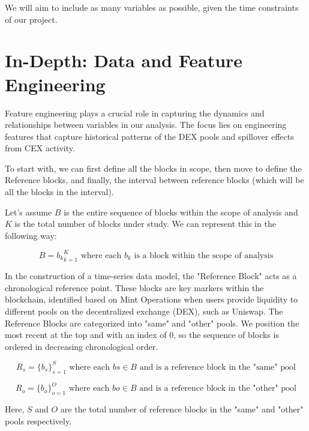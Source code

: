 \documentclass{article}
\begin{document}
{We will aim to include as many variables as possible, given the time constraints of our project.




\section*{\textbf{In-Depth: Data and Feature Engineering}}

Feature engineering plays a crucial role in capturing the dynamics and relationships between variables in our analysis. The focus lies on engineering features that capture historical patterns of the DEX pools and spillover effects from CEX activity.

To start with, we can first define all the blocks in scope, then move to define the Reference blocks, and finally, the interval between reference blocks (which will be all the blocks in the interval).

Let's assume $B$ is the entire sequence of blocks within the scope of analysis and $K$ is the total number of blocks under study. We can represent this in the following way:

\begin{equation}
B = {b_k}_{k=1}^{K} \text{ where each } b_k \text{ is a block within the scope of analysis}
\end{equation}

In the construction of a time-series data model, the "Reference Block" acts as a chronological reference point. These blocks are key markers within the blockchain, identified based on Mint Operations when users provide liquidity to different pools on the decentralized exchange (DEX), such as Uniswap. The Reference Blocks are categorized into "same" and "other" pools. We position the most recent at the top and with an index of 0, so the sequence of blocks is ordered in decreasing chronological order.

\begin{equation}
R_{s} = \{b_{s}\}_{s=1}^{S} \text{ where each } b{s} \in B \text{ and is a reference block in the "same" pool}
\end{equation}

\begin{equation}
R_{o} = \{b_{o}\}_{o=1}^{O} \text{ where each } b{o} \in B \text{ and is a reference block in the "other" pool}
\end{equation}

Here, $S$ and $O$ are the total number of reference blocks in the "same" and "other" pools respectively.

}
\end{document}
